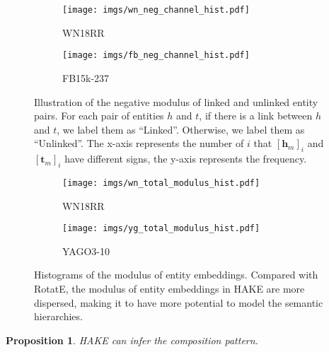 \documentclass[letterpaper]{article} \usepackage{aaai20}  \usepackage{times}  \usepackage{helvet} \usepackage{courier}  \usepackage[hyphens]{url}  \usepackage{graphicx} \urlstyle{rm} \def\UrlFont{\rm}  \usepackage{graphicx}  \frenchspacing  \setlength{\pdfpagewidth}{8.5in}  \setlength{\pdfpageheight}{11in}
\newtheorem{prop}{Proposition}
\begin{document}
\begin{figure}[!h]
  \centering \begin{subfigure}[b]{0.2\textwidth}
  \texttt{[image: imgs/wn\_neg\_channel\_hist.pdf]}
  \caption{WN18RR}
  \end{subfigure}
  \begin{subfigure}[b]{0.2\textwidth}
  \texttt{[image: imgs/fb\_neg\_channel\_hist.pdf]}
  \caption{FB15k-237}
  \end{subfigure}
\caption{Illustration of the negative modulus of linked and unlinked entity pairs. For each pair of entities $h$ and $t$, if there is a link between $h$ and $t$, we label them as ``Linked''. Otherwise, we label them as ``Unlinked''. The x-axis represents the number of $i$ that $[\textbf{h}_m]_i$ and $[\textbf{t}_m]_i$ have different signs, the y-axis represents the frequency.}
\label{fig:neg_channel_illustration}
\end{figure}

\vspace{5mm}
\begin{figure}[!h]
  \centering \begin{subfigure}[b]{0.2\textwidth}
  \texttt{[image: imgs/wn\_total\_modulus\_hist.pdf]}
  \caption{WN18RR}
  \end{subfigure}
  \begin{subfigure}[b]{0.2\textwidth}
  \texttt{[image: imgs/yg\_total\_modulus\_hist.pdf]}
  \caption{YAGO3-10}
  \end{subfigure}
\caption{Histograms of the modulus of entity embeddings. Compared with RotatE, the modulus of entity embeddings in HAKE are more dispersed, making it to have more potential to model the semantic hierarchies.}
\label{fig:total_modulus_hist}
\end{figure}

\begin{prop}
    HAKE can infer the composition pattern.
\end{prop}
\end{document}
